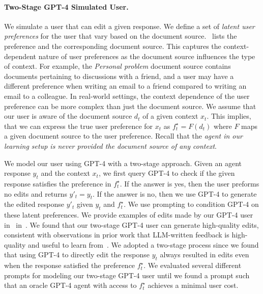 \paragraph{Two-Stage GPT-4 Simulated User.} We simulate a user that can edit a given response. We define a set of \emph{latent user preferences} for the user that vary based on the document source.~ lists the preference and the corresponding document source. This captures the context-dependent nature of user preferences as the document source influences the type of context. For example, the \emph{Personal problem} document source contains documents pertaining to discussions with a friend, and a user may have a different preference when writing an email to a friend compared to writing an email to a colleague. In real-world settings, the context dependence of the user preference can be more complex than just the document source. We assume that our user is aware of the document source $d_t$ of a given context $x_t$. This implies, that we can express the true user preference for $x_t$ as $f^\star_t = F(d_t)$ where $F$ maps a given document source to the user preference. Recall that the \emph{agent in our learning setup is never provided the document source of any context}.

We model our user using GPT-4 with a two-stage approach. Given an agent response $y_t$ and the context $x_t$, we first query GPT-4 to check if the given response satisfies the preference in $f^\star_t$. If the answer is yes, then the user preforms no edits and returns $y'_t = y_t$. If the answer is no, then we use GPT-4 to generate the edited response $y'_t$ given $y_t$ and $f^\star_t$. We use prompting to condition GPT-4 on these latent preferences. %
 We provide examples of edits made by our GPT-4 user in~ in~. We found that our two-stage GPT-4 user can generate high-quality edits, consistent with observations in prior work that LLM-written feedback is high-quality and useful to learn from~\citep{Bai2022ConstitutionalAH,Saunders2022SelfcritiquingMF}. We adopted a two-stage process since we found that using GPT-4 to directly edit the response $y_t$ always resulted in edits even when the response satisfied the preference $f^\star_t$. %
We evaluated several different prompts for modeling our two-stage GPT-4 user until we found a prompt such that an oracle GPT-4 agent with access to $f^\star_t$ achieves a minimal user cost. %

